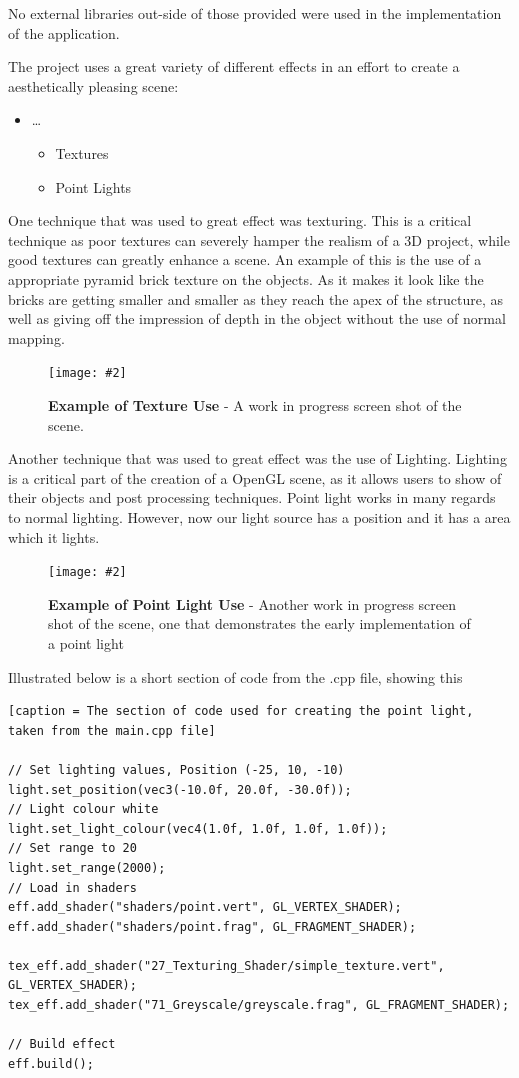 \documentclass[10pt, a4paper]{article}
\newcommand{\figuremacro}[5]{
    \begin{figure}[#1]
        \centering
        \texttt{[image: \#2]}
        \caption[#3]{\textbf{#3}#4}
        \label{fig:#2}
    \end{figure}
}
\begin{document}
    No external libraries out-side of those provided were used in the
    implementation of the application.
    
    The project uses a great variety of different effects in an effort to create a aesthetically pleasing scene: 
    \begin{itemize}
    	\item \dots{}
    	\begin{itemize}
    		\item Textures
    		\item Point Lights
    	\end{itemize}
    \end{itemize}
    
    
    One technique that was used to great effect was texturing. This is a critical technique as poor textures can severely hamper the realism of a 3D project, while good textures can greatly enhance a scene. An example of this is the use of a appropriate pyramid brick texture on the objects. As it makes it look like the bricks are getting smaller and smaller as they reach the apex of the structure, as well as giving off the impression of depth in the object without the use of normal mapping.
    
     \figuremacro{h}{wip}{Example of Texture Use}{ - A work in progress screen shot of the scene.}{1.0}
    
   Another technique that was used to great effect was the use of Lighting. Lighting is a critical part of the creation of a OpenGL scene, as it allows users to show of their objects and post processing techniques. Point light works in many regards to normal lighting. However, now our light source
   has a position and it has a area which it lights.
   
   
   \figuremacro{h}{point_light}{Example of Point Light Use}{ - Another work in progress screen shot of the scene, one that demonstrates the early implementation of a point light}{1.0}
   
   Illustrated below is a short section of code from the .cpp file, showing this
    
 \begin{lstlisting}[caption = The section of code used for creating the point light, taken from the main.cpp file] 

// Set lighting values, Position (-25, 10, -10)
light.set_position(vec3(-10.0f, 20.0f, -30.0f));
// Light colour white
light.set_light_colour(vec4(1.0f, 1.0f, 1.0f, 1.0f));
// Set range to 20
light.set_range(2000);
// Load in shaders
eff.add_shader("shaders/point.vert", GL_VERTEX_SHADER);
eff.add_shader("shaders/point.frag", GL_FRAGMENT_SHADER);

tex_eff.add_shader("27_Texturing_Shader/simple_texture.vert", GL_VERTEX_SHADER);
tex_eff.add_shader("71_Greyscale/greyscale.frag", GL_FRAGMENT_SHADER);

// Build effect
eff.build();
\end{lstlisting}
\end{document}
